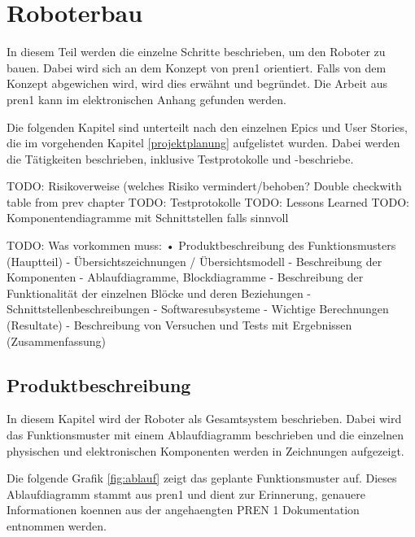 \section{Roboterbau}

In diesem Teil werden die einzelne Schritte beschrieben, um den Roboter zu bauen. Dabei wird sich an dem Konzept von \acrshort{pren1} orientiert. Falls von dem Konzept abgewichen wird, wird dies erwähnt und begründet. Die Arbeit aus \acrshort{pren1} kann im elektronischen Anhang gefunden werden.

Die folgenden Kapitel sind unterteilt nach den einzelnen Epics und User Stories, die im vorgehenden Kapitel \ref{projektplanung} aufgelistet wurden. Dabei werden die Tätigkeiten beschrieben, inklusive Testprotokolle und -beschriebe.

TODO: Risikoverweise (welches Risiko vermindert/behoben? Double checkwith table from prev chapter 
TODO: Testprotokolle
TODO: Lessons Learned
TODO: Komponentendiagramme mit Schnittstellen falls sinnvoll

TODO: 
Was vorkommen muss:
• Produktbeschreibung des Funktionsmusters (Hauptteil)
- Übersichtszeichnungen / Übersichtsmodell
- Beschreibung der Komponenten
- Ablaufdiagramme, Blockdiagramme
- Beschreibung der Funktionalität der einzelnen Blöcke und deren Beziehungen
- Schnittstellenbeschreibungen
- Softwaresubsysteme
- Wichtige Berechnungen (Resultate)
- Beschreibung von Versuchen und Tests mit Ergebnissen (Zusammenfassung)

\subsection{Produktbeschreibung}

In diesem Kapitel wird der Roboter als Gesamtsystem beschrieben. Dabei wird das Funktionsmuster mit einem Ablaufdiagramm beschrieben und die einzelnen physischen und elektronischen Komponenten werden in Zeichnungen aufgezeigt.


Die folgende Grafik \ref{fig:ablauf} zeigt das geplante Funktionsmuster auf. Dieses Ablaufdiagramm stammt aus \acrshort{pren1} und dient zur Erinnerung, genauere Informationen koennen aus der angehaengten PREN 1 Dokumentation entnommen werden.

